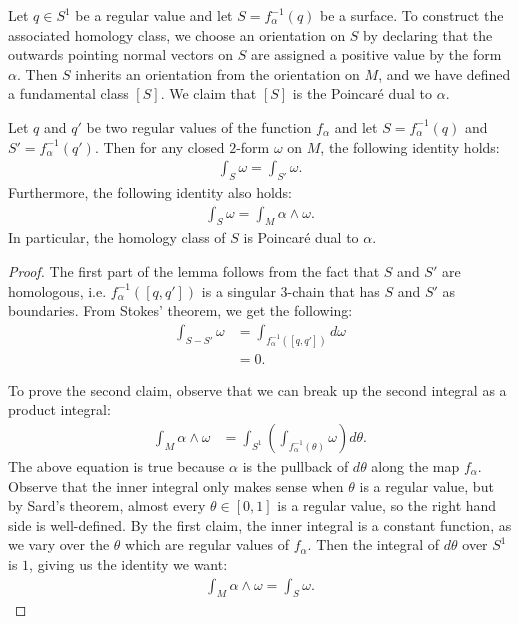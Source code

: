 Let $q\in S^1$ be a regular value and let $S = f_{\alpha}^{-1}(q)$ be a surface.
To construct the associated homology class, we choose an orientation on $S$ by declaring that the outwards pointing normal vectors on $S$ are assigned a positive value by the form $\alpha$.
Then $S$ inherits an orientation from the orientation on $M$, and we have defined a
fundamental class $[S]$.
We claim that $[S]$ is the Poincar\'e dual to $\alpha$.
\begin{lem}
  Let $q$ and $q'$ be two regular values of the function $f_{\alpha}$ and let $S=f_\alpha^{-1}(q)$ and $S'=f_\alpha^{-1}(q')$.
  Then for any closed $2$-form $\omega$ on $M$, the following identity holds:
  \begin{align*}
    \int_{S} \omega = \int_{S'} \omega.
  \end{align*}
  Furthermore, the following identity also holds:
  \begin{align*}
    \int_S \omega = \int_M \alpha \wedge \omega.
  \end{align*}
  In particular, the homology class of $S$ is Poincar\'e dual to $\alpha$.
\end{lem}
\begin{proof}
  The first part of the lemma follows from the fact that $S$ and $S'$ are homologous, i.e. $f^{-1}_{\alpha}([q, q'])$ is a singular $3$-chain that has $S$ and $S'$ as boundaries.
  From Stokes' theorem, we get the following:
  \begin{align*}
    \int_{S - S'} \omega &= \int_{f_{\alpha}^{-1}([q, q'])} d\omega \\
                         &= 0.
  \end{align*}

  To prove the second claim, observe that we can break up the second integral as a product integral:
  \begin{align*}
    \int_M \alpha \wedge \omega &= \int_{S^1} \left(   \int_{f_{\alpha}^{-1}(\theta)} \omega \right) d\theta.
  \end{align*}
  The above equation is true because $\alpha$ is the pullback of $d\theta$ along the map $f_{\alpha}$.
  Observe that the inner integral only makes sense when $\theta$ is a regular value, but by Sard's theorem, almost every $\theta \in [0,1]$ is a regular value, so the right hand side is well-defined.
  By the first claim, the inner integral is a constant function, as we vary over the $\theta$ which are regular values of $f_{\alpha}$.
  Then the integral of $d\theta$ over $S^1$ is $1$, giving us the identity we want:
  \begin{align*}
    \int_M \alpha \wedge \omega = \int_S \omega.
  \end{align*}
\end{proof}
